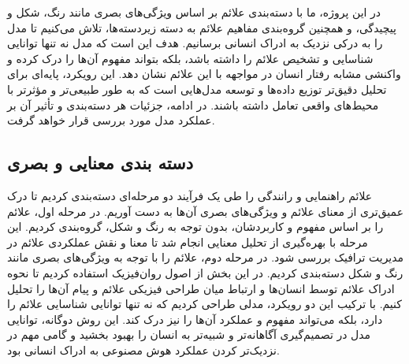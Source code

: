 در این پروژه، ما با دسته‌بندی علائم بر اساس ویژگی‌های بصری مانند رنگ، شکل و پیچیدگی، و همچنین گروه‌بندی مفاهیم علائم به دسته زیردسته‌ها، تلاش می‌کنیم تا مدل را به درکی نزدیک به ادراک انسانی برسانیم. هدف این است که مدل نه تنها توانایی شناسایی و تشخیص علائم را داشته باشد، بلکه بتواند مفهوم آن‌ها را درک کرده و واکنشی مشابه رفتار انسان در مواجهه با این علائم نشان دهد. این رویکرد، پایه‌ای برای تحلیل دقیق‌تر توزیع داده‌ها و توسعه مدل‌هایی است که به طور طبیعی‌تر و مؤثرتر با محیط‌های واقعی تعامل داشته باشند. در ادامه، جزئیات هر دسته‌بندی و تأثیر آن بر عملکرد مدل مورد بررسی قرار خواهد گرفت.

\subsection{دسته بندی معنایی و بصری}


علائم راهنمایی و رانندگی را طی یک فرآیند دو مرحله‌ای دسته‌بندی کردیم تا درک عمیق‌تری از معنای علائم و ویژگی‌های بصری آن‌ها به دست آوریم. در مرحله اول، علائم را بر اساس مفهوم و کاربردشان، بدون توجه به رنگ و شکل، گروه‌بندی کردیم. این مرحله با بهره‌گیری از تحلیل معنایی انجام شد تا معنا و نقش عملکردی علائم در مدیریت ترافیک بررسی شود. در مرحله دوم، علائم را با توجه به ویژگی‌های بصری مانند رنگ و شکل دسته‌بندی کردیم. در این بخش از اصول روان‌فیزیک استفاده کردیم تا نحوه ادراک علائم توسط انسان‌ها و ارتباط میان طراحی فیزیکی علائم و پیام آن‌ها را تحلیل کنیم. با ترکیب این دو رویکرد، مدلی طراحی کردیم که نه تنها توانایی شناسایی علائم را دارد، بلکه می‌تواند مفهوم و عملکرد آن‌ها را نیز درک کند. این روش دوگانه، توانایی مدل در تصمیم‌گیری آگاهانه‌تر و شبیه‌تر به انسان را بهبود بخشید و گامی مهم در نزدیک‌تر کردن عملکرد هوش مصنوعی به ادراک انسانی بود.


